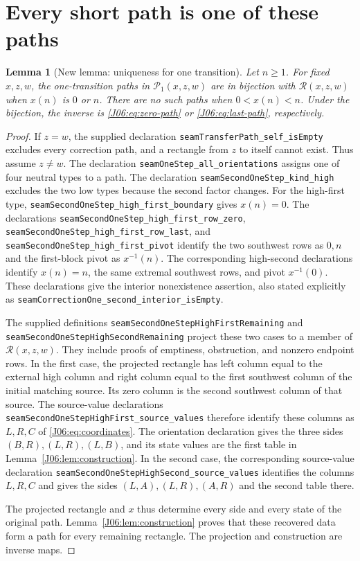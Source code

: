 \documentclass[11pt,oneside]{report}
\newtheorem{lemma}[theorem]{Lemma}
\theoremstyle{definition}
\numberwithin{equation}{section}
\newcommand{\decl}[1]{\textnormal{\nolinkurl{#1}}}
\newcommand{\cP}{\mathcal P}
\newcommand{\cR}{\mathcal R}
\begin{document}
\section{Every short path is one of these paths}

\begin{lemma}[New lemma: uniqueness for one transition]
\label{J06:lem:one}
Let $n\ge1$. For fixed $x,z,w$, the one-transition paths in
$\cP_1(x,z,w)$ are in bijection with $\cR(x,z,w)$ when $x(n)$ is
$0$ or $n$. There are no such paths when $0<x(n)<n$.
Under the bijection, the inverse is \eqref{J06:eq:zero-path} or
\eqref{J06:eq:last-path}, respectively.
\end{lemma}

\begin{proof}
If $z=w$, the supplied declaration
\decl{seamTransferPath_self_isEmpty} excludes every correction path,
and a rectangle from $z$ to itself cannot exist. Thus assume $z\ne w$.
The declaration \decl{seamOneStep_all_orientations} assigns one of four
neutral types to a path. The declaration
\decl{seamSecondOneStep_kind_high} excludes the two low types because
the second factor changes. For the high-first type,
\decl{seamSecondOneStep_high_first_boundary} gives $x(n)=0$.
The declarations
\decl{seamSecondOneStep_high_first_row_zero},
\decl{seamSecondOneStep_high_first_row_last}, and
\decl{seamSecondOneStep_high_first_pivot} identify the two southwest
rows as $0,n$ and the first-block pivot as $x^{-1}(n)$.
The corresponding high-second declarations identify $x(n)=n$, the
same extremal southwest rows, and pivot $x^{-1}(0)$.
These declarations give the interior nonexistence assertion, also stated
explicitly as \decl{seamCorrectionOne_second_interior_isEmpty}.

The supplied definitions
\decl{seamSecondOneStepHighFirstRemaining} and
\decl{seamSecondOneStepHighSecondRemaining} project these two cases
to a member of $\cR(x,z,w)$. They include proofs of emptiness,
obstruction, and nonzero endpoint rows.
In the first case, the projected rectangle has left column equal to the
external high column and right column equal to the first southwest
column of the initial matching source. Its zero column is the second
southwest column of that source. The source-value declarations
\decl{seamSecondOneStepHighFirst_source_values} therefore identify
these columns as $L,R,C$ of \eqref{J06:eq:coordinates}.
The orientation declaration gives the three sides
$(B,R),(L,R),(L,B)$, and its state values are the first table in
Lemma~\ref{J06:lem:construction}.
In the second case, the corresponding source-value declaration
\decl{seamSecondOneStepHighSecond_source_values} identifies the
columns $L,R,C$ and gives the sides $(L,A),(L,R),(A,R)$ and the
second table there.

The projected rectangle and $x$ thus determine every side and every
state of the original path. Lemma~\ref{J06:lem:construction} proves that
these recovered data form a path for every remaining rectangle.
The projection and construction are inverse maps.
\end{proof}
\end{document}
